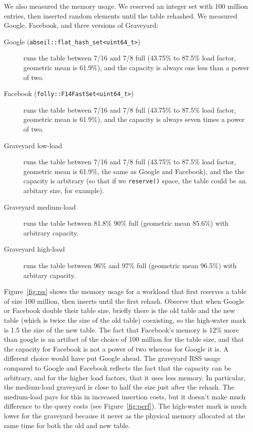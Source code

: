 \documentclass[10pt]{article}
\theoremstyle{remark}
\theoremstyle{remark}
\newcommand{\figref}[1]{Figure~\ref{fig:#1}}
\begin{document}
We also measured the memory usage.  We reserved an integer set with
100 million entries, then inserted random elements until the table
rehashed.  We measured Google, Facebook, and three versions of
Graveyard:
\begin{description}
  \item[Google (\texttt{abseil::flat\_hash\_set<uint64\_t>})] runs the
    table between 7/16 and 7/8 full (43.75\% to 87.5\% load factor,
    geometric mean is 61.9\%), and the capacity is always one less
    than a power of two.
  \item[Facebook (\texttt{folly::F14FastSet<uint64\_t>})] runs the table
    between 7/16 and 7/8 full (43.75\% to 87.5\% load factor,
    geometric mean is 61.9\%), and the capacity is always seven times
    a power of two.
  \item[Graveyard low-load] runs the table between 7/16 and 7/8 full
    (43.75\% to 87.5\% load factor, geometric mean is 61.9\%, the same
    as Google and Facebook), and the the capacity is arbitrary (so
    that if we \verb+reserve()+ space, the table could be an arbitary
    size, for example).
  \item[Graveyard medium-load]  runs the table between 81.8\% 90\% full (geometric mean 85.6\%) with arbitrary capacity.
  \item[Graveyard high-load] runs the table between 96\% and 97\% full (geometric mean 96.5\%) with arbitary capacity.
\end{description}

\figref{rss} shows the memory usage for a workload that first reserves
a table of size 100 million, then inserts until the first rehash.
Observe that when Google or Facebook double their table size, briefly
there is the old table and the new table (which is twice the size of
the old table) coexisting, so the high-water mark is 1.5 the size of
the new table.  The fact that Facebook's memory is 12\% more than
google is an artifact of the choice of 100 million for the table size,
and that the capacity for Facebook is not a power of two whereas for
Google it is.  A different choice would have put Google ahead.  The
graveyard RSS usage compared to Google and Facebook reflects the fact
that the capacity can be arbitrary, and for the higher load factors,
that it uses less memory.  In particular, the medium-load graveyard is
close to half the size just after the rehash.  The medium-load pays
for this in increased insertion costs, but it doesn't make much
difference to the query costs (see \figref{perf}).  The high-water
mark is much lower for the graveyard because it never as the physical
memory allocated at the same time for both the old and new table.
\end{document}
